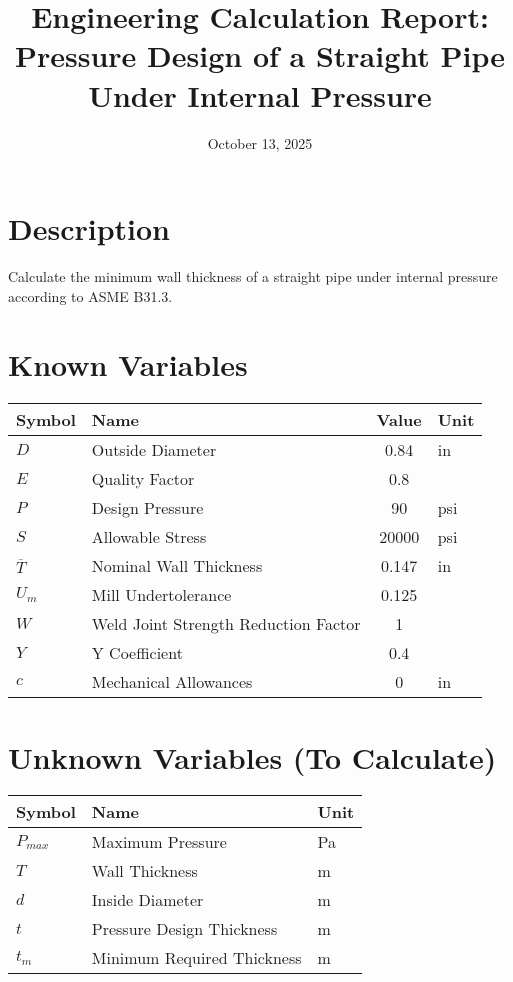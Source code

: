 \documentclass[11pt,a4paper]{article}
\title{Engineering Calculation Report: Pressure Design of a Straight Pipe Under Internal Pressure}
\date{October 13, 2025}
\begin{document}
\maketitle

\section*{Description}
Calculate the minimum wall thickness of a straight pipe under internal pressure according to ASME B31.3.

\section{Known Variables}

\begin{longtable}{llSl}
\toprule
Symbol & Name & {Value} & Unit \\
\midrule
\endhead
$D$ & Outside Diameter & 0.84 & in \\
$E$ & Quality Factor & 0.8 &  \\
$P$ & Design Pressure & 90 & psi \\
$S$ & Allowable Stress & 20000 & psi \\
$\overline{T}$ & Nominal Wall Thickness & 0.147 & in \\
$U_{m}$ & Mill Undertolerance & 0.125 &  \\
$W$ & Weld Joint Strength Reduction Factor & 1 &  \\
$Y$ & Y Coefficient & 0.4 &  \\
$c$ & Mechanical Allowances & 0 & in \\
\bottomrule
\end{longtable}

\section{Unknown Variables (To Calculate)}

\begin{longtable}{lll}
\toprule
Symbol & Name & Unit \\
\midrule
\endhead
$P_{max}$ & Maximum Pressure & Pa \\
$T$ & Wall Thickness & m \\
$d$ & Inside Diameter & m \\
$t$ & Pressure Design Thickness & m \\
$t_{m}$ & Minimum Required Thickness & m \\
\bottomrule
\end{longtable}
\end{document}
